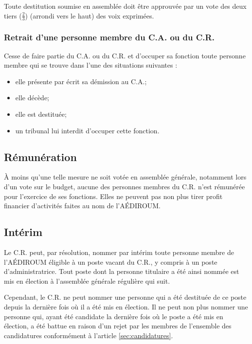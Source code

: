 \documentclass{aediroum}
\newcommand{\article}[1]{article \ref{#1}}
\begin{document}
Toute destitution soumise en assemblée doit être approuvée par un vote des deux tiers ($\frac{2}{3}$) (arrondi vers le haut) des voix exprimées.

\subsubsection{Retrait d'une personne membre du C.A. ou du C.R.}\label{sec:retrait-dun-membre-exec-admin}

Cesse de faire partie du C.A. ou du C.R. et d'occuper sa fonction toute personne membre qui se trouve dans l'une des situations suivantes :
\begin{itemize}
    \item elle présente par écrit sa démission au C.A.;
    \item elle décède;
    \item elle est destituée;
    \item un tribunal lui interdit d'occuper cette fonction.
\end{itemize}

\subsection{Rémunération}\label{sec:renumeration}

À moins qu'une telle mesure ne soit votée en assemblée générale, notamment lors d'un vote sur le budget, aucune des personnes membres du C.R. n'est rémunérée pour l'exercice de ses fonctions. Elles ne peuvent pas non plus tirer profit financier d'activités faites au nom de l'AÉDIROUM.

\subsection{Intérim}\label{sec:interim}

Le C.R. peut, par résolution, nommer par intérim toute personne membre de l'AÉDIROUM éligible à un poste vacant du C.R., y compris à un poste d'administratrice. Tout poste dont la personne titulaire a été ainsi nommée est mis en élection à l'assemblée générale régulière qui suit.

Cependant, le C.R. ne peut nommer une personne qui a été destituée de ce poste depuis la dernière fois où il a été mis en élection. Il ne peut non plus nommer une personne qui, ayant été candidate la dernière fois où le poste a été mis en élection, a été battue en raison d'un rejet par les membres de l'ensemble des candidatures conformément à l'\article{sec:candidatures}.
\end{document}
